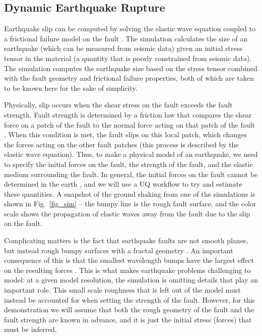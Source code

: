 \documentclass[openacc]{rstransa}%
\begin{document}
\subsection{Dynamic Earthquake Rupture}

Earthquake slip can be computed by solving the elastic wave equation coupled to a frictional failure model
on the fault \cite{earthquakedynamics}. The simulation calculates the size of an earthquake (which can be measured from seismic data) \cite{akirichards}
given an initial stress tensor in the material (a quantity that is poorly constrained from seismic data).
The simulation computes the earthquake size based on the stress tensor combined with the fault geometry and
frictional failure properties, both of which are taken to be known here for the sake of simplicity.

Physically, slip occurs when the shear stress on the fault exceeds the fault strength. Fault strength is
determined by a friction law that compares the shear force on a patch of the fault to the normal force acting
on that patch of the fault \cite{slipweak}. When this condition is met, the fault slips on this local patch, which changes
the forces acting on the other fault patches (this process is described by the elastic wave equation).
Thus, to make a physical model of an earthquake, we need to specify the initial forces on the fault, the
strength of the fault, and the elastic medium surrounding the fault. In general, the initial forces on the
fault cannot be determined in the earth \cite{earthquakemech},
and we will use a UQ workflow to try and estimate these quantities.
A snapshot of the ground shaking from one of the simulations is shown in Fig.~\ref{fig_sim} --
the bumpy line is the rough fault surface, and the color scale shows the propagation of elastic waves away
from the fault due to the slip on the fault.

Complicating matters is the fact that earthquake faults are not smooth planes, but instead rough bumpy surfaces
with a fractal geometry \cite{fractalfault}. An important consequence of this is that the smallest wavelength bumps have the
largest effect on the resulting forces \cite{roughfault}. This is what makes earthquake problems challenging to model: at a given
model resolution, the simulation is omitting details that play an important role. This small scale roughness that is left
out of the model must instead be accounted for when setting the strength of the fault. However, for this
demonstration we will assume that both the rough geometry of the fault and the fault strength are known in
advance, and it is just the initial stress (forces) that must be inferred.
\end{document}
